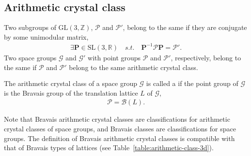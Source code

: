 
\subsection{\label{sec:arithmetic-crystal-class}Arithmetic crystal class}

\begin{screen}
  \begin{definition}
    Two subgroups of $\mathrm{GL}(3, \mathbb{Z})$, $\mathcal{P}$ and $\mathcal{P}'$, belong to the same  if they are conjugate by some unimodular matrix,
    \begin{align}
      \exists \bm{P} \in \mathrm{SL}(3, \mathbb{R}) \quad s.t. \quad \bm{P}^{-1} \mathcal{P} \bm{P} = \mathcal{P}'.
    \end{align}
    Two space groups $\mathcal{G}$ and $\mathcal{G}'$ with point groups $\mathcal{P}$ and $\mathcal{P}'$, respectively, belong to the same  if $\mathcal{P}$ and $\mathcal{P}'$ belong to the same arithmetic crystal class.
  \end{definition}
\end{screen}

\begin{screen}
  \begin{definition}
    The arithmetic crystal class of a space group $\mathcal{G}$ is called a  if the point group of $\mathcal{G}$ is the Bravais group of the translation lattice $L$ of $\mathcal{G}$,
    \begin{align}
      \mathcal{P} = \mathcal{B}(L).
    \end{align}
  \end{definition}
\end{screen}

Note that Bravais arithmetic crystal classes are classifications for arithmetic crystal classes of space groups, and Bravais classes are classifications for space groups.
The definition of Bravais arithmetic crystal classes is compatible with that of Bravais types of lattices (see Table~\ref{table:arithmetic-class-3d}).

